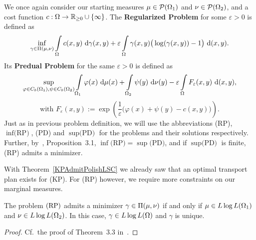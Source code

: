 \begin{definition}\label{RegProbs}
	We once again consider our starting measures $\mu \in \PM{\Omega_1}$ and $\nu \in \PM{\Omega_2}$, and a cost function $\map[c]{\Omega}{\RZero \cup \{ \infty \}}$. The \textbf{Regularized Problem} for some $\varepsilon > 0$ is defined as
	\[ \inf\limits_{\gamma \in \TP{\mu}{\nu}} \int\limits_\Omega c(x, y)~\Dx[x, y]{\gamma} + \varepsilon \int\limits_\Omega \gamma(x, y) \big( \log(\gamma(x, y)) - 1 \big)~\Dx[x, y]{}. \]
	Its \textbf{Predual Problem} for the same $\varepsilon > 0$ is defined as
	\[ \sup\limits_{\varphi \in \CF[b]{\Omega_1}, \psi \in \CF[b]{\Omega_2}} \int\limits_{\Omega_1} \varphi(x)~\Dx{\mu} + \int\limits_{\Omega_2} \psi(y)~\Dx[y]{\nu} - \varepsilon \int\limits_\Omega F_{\varepsilon}(x, y)~\Dx[x, y]{}, \]
	\[ \text{with } F_{\varepsilon}(x, y) := \exp\left( \frac{1}{\varepsilon} \big( \varphi(x) + \psi(y) - c(x, y) \big) \right). \]
	Just as in previous problem definition, we will use the abbreviations (RP), $\inf \text{(RP)}$, (PD) and $\sup \text{(PD)}$ for the problems and their solutions respectively. Further, by~\cite{Cla2021}, Proposition~3.1, $\inf \text{(RP)} = \sup \text{(PD)}$, and if $\sup \text{(PD)}$ is finite, (RP) admits a minimizer.
\end{definition}

With Theorem~\ref{KPAdmitPolishLSC} we already saw that an optimal transport plan exists for (KP). For (RP) however, we require more constraints on our marginal measures.

\begin{theorem}\label{RegProbAdmitLLL}
	The problem$\text{\normalfont\ (RP)}$ admits a minimizer $\gamma \in \TP{\mu}{\nu}$ if and only if $\mu \in \LLL[\Omega_1]$ and $\nu \in \LLL[\Omega_2]$. In this case, $\gamma \in \LLL$ and $\gamma$ is unique.
\end{theorem}

\begin{proof}
	Cf.~the proof of Theorem~3.3 in~\cite{Cla2021}.
\end{proof}


